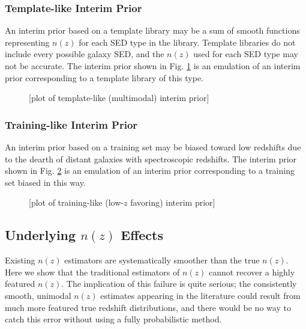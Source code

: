 \documentclass[iop]{emulateapj}
\begin{document}
\subsubsection{Template-like Interim Prior}
\label{sec:tempintpr}

An interim prior based on a template library may be a sum of smooth functions representing $n(z)$ for each SED type in the library.  Template libraries do not include every possible galaxy SED, and the $n(z)$ used for each SED type may not be accurate.  The interim prior shown in Fig. \ref{fig:tempintpr} is an emulation of an interim prior corresponding to a template library of this type.

\begin{figure}
	\begin{center}
		\caption{[plot of template-like (multimodal) interim prior]}
		\label{fig:tempintpr}
	\end{center}
\end{figure}

\subsubsection{Training-like Interim Prior}
\label{sec:trainintpr}

An interim prior based on a training set may be biased toward low redshifts due to the dearth of distant galaxies with spectroscopic redshifts.  The interim prior shown in Fig. \ref{fig:trainintpr} is an emulation of an interim prior corresponding to a training set biased in this way.

\begin{figure}
	\begin{center}
		\caption{[plot of training-like (low-$z$ favoring) interim prior]}
		\label{fig:trainintpr}
	\end{center}
\end{figure}

\subsection{Underlying $n(z)$ Effects}
\label{sec:truth}

Existing $n(z)$ estimators are systematically smoother than the true $n(z)$.  Here we show that the traditional estimators of $n(z)$ cannot recover a highly featured $n(z)$.  The implication of this failure is quite serious; the consistently smooth, unimodal $n(z)$ estimates appearing in the literature could result from much more featured true redshift distributions, and there would be no way to catch this error without using a fully probabilistic method.
\end{document}

